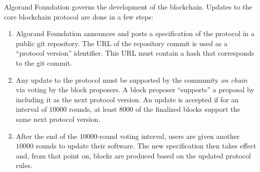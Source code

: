 \documentclass[../main.tex]{subfiles}
\begin{document}
Algorand Foundation governs the development of the blockchain. 
Updates to the core blockchain protocol are done in a few steps: 
\begin{enumerate}

\item Algorand Foundation announces and posts a specification of the protocol in a public git repository. The URL of the repository commit is used as a ``protocol version'' identifier. This URL must contain a hash that corresponds to the git commit.

\item Any update to the protocol must be supported by the community \emph{on chain} via voting by the block proposers. A block proposer ``supports'' a proposal by including it as the next protocol version. An update is accepted if for an interval of $10000$ rounds, at least $8000$ of the finalized blocks support the same next protocol version.

\item After the end of the $10000$-round voting interval, users are given another $10000$ rounds to update their software. The new specification then takes effect and, from that point on, blocks are produced based on the updated protocol rules.

\end{enumerate}
\end{document}
